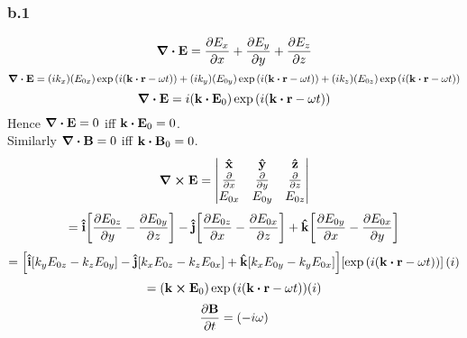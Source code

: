 \subsubsection*{b.1}
\[\div{\vb{E}}=\pdv{E_x}{x}+\pdv{E_y}{y}+\pdv{E_z}{z}\]
\[\div{\vb{E}}=(ik_x)(E_{0x})\exp\qty(i\qty(\vb{k}\vdot\vb{r}-\omega{t}))+(ik_y)(E_{0y})\exp\qty(i\qty(\vb{k}\vdot\vb{r}-\omega{t}))+(ik_z)(E_{0z})\exp\qty(i\qty(\vb{k}\vdot\vb{r}-\omega{t}))\]
\[\div{\vb{E}}=i(\vb{k}\vdot{\vb{E}_0})\exp\qty(i\qty(\vb{k}\vdot\vb{r}-\omega{t}))\]
Hence $\div{\vb{E}}=0$ iff $\vb{k}\vdot\vb{E}_0=0$.\\
Similarly $\div{\vb{B}}=0$ iff $\vb{k}\vdot\vb{B}_0=0$.
\[
\curl{\vb{E}}=
\begin{vmatrix}
\vu{x}& \vu{y}& \vu{z} \\
\pdv{x}& \pdv{y}& \pdv{z} \\
E_{0x}& E_{0y}& E_{0z}
\end{vmatrix}
\]
\[=\vu{i}\qty[\pdv{E_{0z}}{y}-\pdv{E_{0y}}{z}]-\vu{j}\qty[\pdv{E_{0z}}{x}-\pdv{E_{0x}}{z}]+\vu{k}\qty[\pdv{E_{0y}}{x}-\pdv{E_{0x}}{y}]\]
\[=\qty[\vu{i}\qty[k_yE_{0z}-k_zE_{0y}]-\vu{j}\qty[k_xE_{0z}-k_zE_{0x}]+\vu{k}\qty[k_xE_{0y}-k_yE_{0x}]]\qty[\exp\qty(i\qty(\vb{k}\vdot\vb{r}-\omega{t}))](i)\]
\[=\qty(\vb{k}\cp\vb{E}_0)\exp\qty(i\qty(\vb{k}\vdot\vb{r}-\omega{t}))(i)\]
\[\pdv{\vb{B}}{t}=\qty(-i\omega)\]

